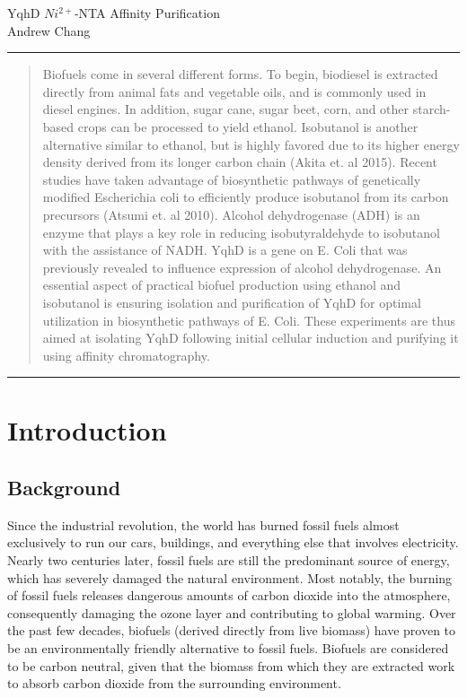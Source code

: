 \documentclass[12pt, letterpaper]{article}
\begin{document}
 \begin{center}
    \huge{YqhD $Ni^{2+}$-NTA Affinity Purification} \\[10pt]
    \large{Andrew Chang}
 \end{center}

 \rule{\textwidth}{0.5pt} 

 \begin{abstract}
    \noindent Biofuels come in several different forms. To begin, biodiesel is extracted directly from animal fats and vegetable oils, and is commonly used in diesel engines. In addition, sugar cane, sugar beet, corn, and other starch-based crops can be processed to yield ethanol. Isobutanol is another alternative similar to ethanol, but is highly favored due to its higher energy density derived from its longer carbon chain (Akita et. al 2015). Recent studies have taken advantage of biosynthetic pathways of genetically modified Escherichia coli to efficiently produce isobutanol from its carbon precursors (Atsumi et. al 2010). Alcohol dehydrogenase (ADH) is an enzyme that plays a key role in reducing isobutyraldehyde to isobutanol with the assistance of NADH. YqhD is a gene on E. Coli that was previously revealed to influence expression of alcohol dehydrogenase. An essential aspect of practical biofuel production using ethanol and isobutanol is ensuring isolation and purification of YqhD for optimal utilization in biosynthetic pathways of E. Coli. These experiments are thus aimed at isolating YqhD following initial cellular induction and purifying it using affinity chromatography. 
 \end{abstract}
 \rule{\textwidth}{0.5pt} %

\section{Introduction}
\subsection{Background}
Since the industrial revolution, the world has burned fossil fuels almost exclusively to run our cars, buildings, and everything else that involves electricity. Nearly two centuries later, fossil fuels are still the predominant source of energy, which has severely damaged the natural environment. Most notably, the burning of fossil fuels releases dangerous amounts of carbon dioxide into the atmosphere, consequently damaging the ozone layer and contributing to global warming. Over the past few decades, biofuels (derived directly from live biomass) have proven to be an environmentally friendly alternative to fossil fuels. Biofuels are considered to be carbon neutral, given that the biomass from which they are extracted work to absorb carbon dioxide from the surrounding environment.
\end{document}

